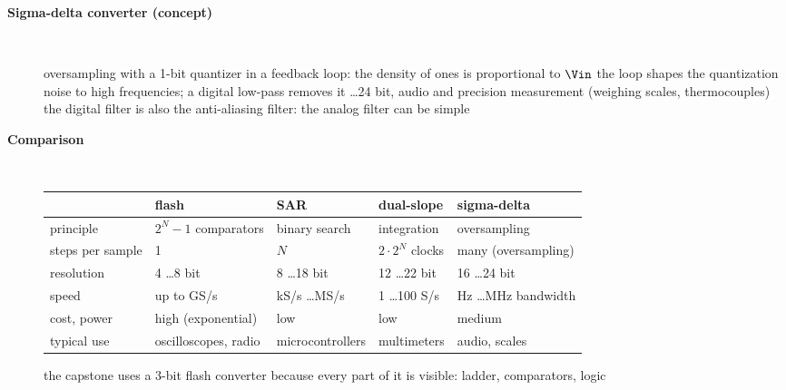 \begin{description}
\item[{\rot\bf Sigma-delta converter (concept)}]~\\[-\lblskip]
\begin{center}
\end{center}
\bi
	\ite oversampling with a 1-bit quantizer in a feedback loop: the density of ones is proportional to $\Vin$
	\ite the loop shapes the quantization noise to high frequencies; a digital low-pass removes it
	 \ldots 24 bit, audio and precision measurement (weighing scales, thermocouples)
	\ite the digital filter is also the anti-aliasing filter: the analog filter can be simple
\ei
\os{\newpage}

\item[{\rot\bf Comparison}]~\\[-\lblskip]
\begin{center}
\footnotesize
\begin{tabular}{@{}lllll@{}}
\toprule
 & flash & SAR & dual-slope & sigma-delta\\
\midrule
principle & $2^N-1$ comparators & binary search & integration & oversampling\\
steps per sample & 1 & $N$ & $2\cdot 2^N$ clocks & many (oversampling)\\
resolution & 4 \ldots 8 bit & 8 \ldots 18 bit & 12 \ldots 22 bit & 16 \ldots 24 bit\\
speed & up to GS/s & kS/s \ldots MS/s & 1 \ldots 100 S/s & Hz \ldots MHz bandwidth\\
cost, power & high (exponential) & low & low & medium\\
typical use & oscilloscopes, radio & microcontrollers & multimeters & audio, scales\\
\bottomrule
\end{tabular}
\end{center}
\bi
	\ite the capstone uses a 3-bit flash converter because every part of it is visible: ladder, comparators, logic
\ei
\os{\newpage}
\end{description}

